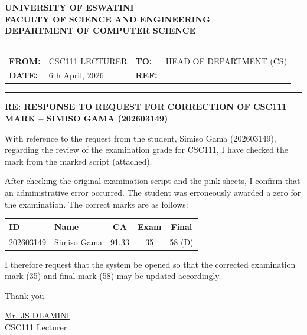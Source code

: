 \documentclass[a4paper,12pt]{article}
\begin{document}
\begin{center}
    \textbf{UNIVERSITY OF ESWATINI} \\
     \textbf{FACULTY OF SCIENCE AND ENGINEERING} \\
      \textbf{DEPARTMENT OF COMPUTER SCIENCE}
\end{center}

\vspace{0.3cm}
\hrule
\vspace{0.3cm}

\noindent
\begin{tabular}{@{}p{}@{}p{}@{}p{}@{}p{}@{}}
    \textbf{FROM:} & CSC111 LECTURER & \textbf{TO:} & HEAD OF DEPARTMENT (CS) \\
    \textbf{DATE:} & 6th April, 2026 & \textbf{REF:} & \\
\end{tabular}

\vspace{0.2cm}
\hrule
\vspace{0.2cm}

\noindent
\textbf{RE: RESPONSE TO REQUEST FOR CORRECTION OF CSC111 MARK – SIMISO GAMA (202603149)}

\vspace{0.5cm}

\noindent
With reference to the request from the student, Simiso Gama (202603149), regarding the review of the examination grade for CSC111, I have checked the mark from the marked script (attached).

\vspace{0.3cm}
\noindent
After checking the original examination script and the pink sheets, I confirm that an administrative error occurred. The student was erroneously awarded a zero for the examination. The correct marks are as follows:

\vspace{0.3cm}
\begin{center}
    \begin{tabular}{@{}l l c c c@{}}
        \toprule
        \textbf{ID} & \textbf{Name} & \textbf{CA} & \textbf{Exam} & \textbf{Final} \\
        \midrule
        202603149 & Simiso Gama & 91.33 & 35 &  58 (D) \\
        \bottomrule
    \end{tabular}
\end{center}

 
\vspace{0.3cm}
\noindent
I therefore request that the system be opened so that the corrected examination mark (35) and final mark (58) may be updated accordingly.

\vspace{0.5cm}
\noindent

\vspace{1cm}
\noindent
Thank you.

\vspace{1.2cm}
\noindent
\underline{Mr. JS DLAMINI} \\
CSC111 Lecturer

\vfill
\noindent
\end{document}
